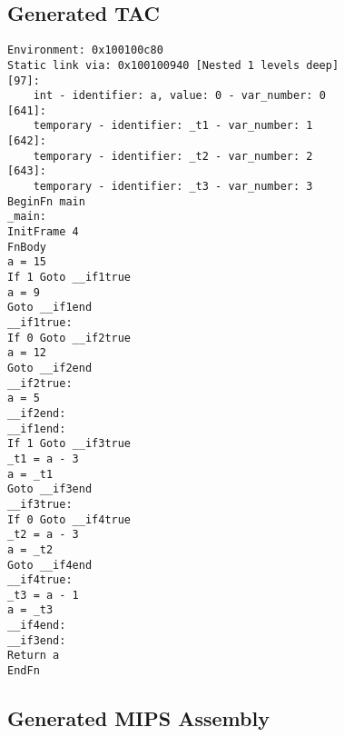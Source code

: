 \subsection{Generated TAC}
\begin{verbatim}
Environment: 0x100100c80
Static link via: 0x100100940 [Nested 1 levels deep]
[97]:
	int - identifier: a, value: 0 - var_number: 0
[641]:
	temporary - identifier: _t1 - var_number: 1
[642]:
	temporary - identifier: _t2 - var_number: 2
[643]:
	temporary - identifier: _t3 - var_number: 3
BeginFn main
_main:
InitFrame 4
FnBody
a = 15
If 1 Goto __if1true
a = 9
Goto __if1end
__if1true:
If 0 Goto __if2true
a = 12
Goto __if2end
__if2true:
a = 5
__if2end:
__if1end:
If 1 Goto __if3true
_t1 = a - 3
a = _t1
Goto __if3end
__if3true:
If 0 Goto __if4true
_t2 = a - 3
a = _t2
Goto __if4end
__if4true:
_t3 = a - 1
a = _t3
__if4end:
__if3end:
Return a
EndFn
\end{verbatim}\subsection{Generated MIPS Assembly}
